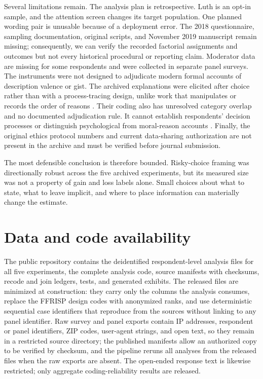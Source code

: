 \documentclass[11pt]{article}
\begin{document}
Several limitations remain. The analysis plan is retrospective. Luth is an opt-in sample, and the attention screen changes its target population. One planned wording pair is unusable because of a deployment error. The 2018 questionnaire, sampling documentation, original scripts, and November 2019 manuscript remain missing; consequently, we can verify the recorded factorial assignments and outcomes but not every historical procedural or reporting claim. Moderator data are missing for some respondents and were collected in separate panel surveys. The instruments were not designed to adjudicate modern formal accounts of description valence or gist. The archived explanations were elicited after choice rather than with a process-tracing design, unlike work that manipulates or records the order of reasons \parencite{wall2020query,composto2025query}. Their coding also has unresolved category overlap and no documented adjudication rule. It cannot establish respondents' decision processes or distinguish psychological from moral-reason accounts \parencite{zuradzki2026reasons}. Finally, the original ethics protocol numbers and current data-sharing authorization are not present in the archive and must be verified before journal submission.

The most defensible conclusion is therefore bounded. Risky-choice framing was directionally robust across the five archived experiments, but its measured size was not a property of gain and loss labels alone. Small choices about what to state, what to leave implicit, and where to place information can materially change the estimate.

\section*{Data and code availability}

The public repository contains the deidentified respondent-level analysis files for all five experiments, the complete analysis code, source manifests with checksums, recode and join ledgers, tests, and generated exhibits. The released files are minimized at construction: they carry only the columns the analysis consumes, replace the FFRISP design codes with anonymized ranks, and use deterministic sequential case identifiers that reproduce from the sources without linking to any panel identifier. Raw survey and panel exports contain IP addresses, respondent or panel identifiers, ZIP codes, user-agent strings, and open text, so they remain in a restricted source directory; the published manifests allow an authorized copy to be verified by checksum, and the pipeline reruns all analyses from the released files when the raw exports are absent. The open-ended response text is likewise restricted; only aggregate coding-reliability results are released.
\end{document}
